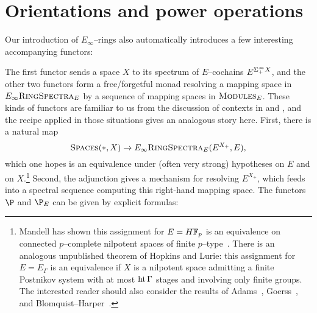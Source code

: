 










\section{Orientations and power operations}\label{PowerOpnsSection}

Our introduction of \(E_\infty\)--rings also automatically introduces a few interesting accompanying functors:
\begin{center}
\end{center}
The first functor sends a space \(X\) to its spectrum of \(E\)--cochains \(E^{\Sigma^\infty_+ X}\), and the other two functors form a free/forgetful monad resolving a mapping space in \(E_\infty\normalfont\textsc{RingSpectra}_E\) by a sequence of mapping spaces in \(\normalfont\textsc{Modules}_E\).  These kinds of functors are familiar to us from the discussion of contexts in  and , and the recipe applied in those situations gives an analogous story here.  First, there is a natural map \[\normalfont\textsc{Spaces}(*, X) \to E_\infty\normalfont\textsc{RingSpectra}_E(E^{X_+}, E),\] which one hopes is an equivalence under (often very strong) hypotheses on \(E\) and on \(X\).\footnote{Mandell has shown this assignment for \(E = \HFp\) is an equivalence on connected \(p\)--complete nilpotent spaces of finite \(p\)--type~\cite{Mandell}.  There is an analogous unpublished theorem of Hopkins and Lurie: this assignment for \(E = E_\Gamma\) is an equivalence if \(X\) is a nilpotent space admitting a finite Postnikov system with at most \(\operatorname{ht} \Gamma\) stages and involving only finite groups.  The interested reader should also consider the results of Adams~\cite{AdamsOnCobar}, Goerss~\cite{GoerssChains}, and Blomquist--Harper~\cite{BlomquistHarper}.}  Second, the adjunction gives a mechanism for resolving \(E^{X_+}\), which feeds into a spectral sequence computing this right-hand mapping space.  The functors \(\P\) and \(\P_E\) can be given by explicit formulas:
